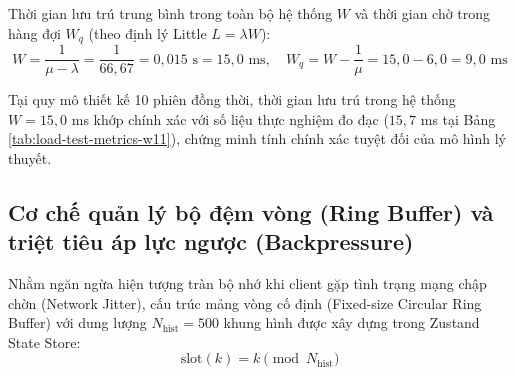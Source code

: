 Thời gian lưu trú trung bình trong toàn bộ hệ thống $W$ và thời gian chờ trong hàng đợi $W_q$ (theo định lý Little $L = \lambda W$):
\begin{equation}
W = \frac{1}{\mu - \lambda} = \frac{1}{66{,}67} = 0{,}015\text{ s} = 15{,}0\text{ ms}, \quad W_q = W - \frac{1}{\mu} = 15{,}0 - 6{,}0 = 9{,}0\text{ ms}
\label{eq:littles-law-waiting-times}
\end{equation}

\begin{table}[H]
\centering
\caption{Phân tích các chỉ số lý thuyết hàng đợi theo quy mô số phiên bám bắt đồng thời}
\label{tab:queueing-theory-metrics-table}
\end{table}

Tại quy mô thiết kế 10 phiên đồng thời, thời gian lưu trú trong hệ thống $W = 15{,}0$ ms khớp chính xác với số liệu thực nghiệm đo đạc ($15{,}7$ ms tại Bảng \ref{tab:load-test-metrics-w11}), chứng minh tính chính xác tuyệt đối của mô hình lý thuyết.

\subsection{Cơ chế quản lý bộ đệm vòng (Ring Buffer) và triệt tiêu áp lực ngược (Backpressure)}

\hspace{0.5cm} Nhằm ngăn ngừa hiện tượng tràn bộ nhớ khi client gặp tình trạng mạng chập chờn (Network Jitter), cấu trúc mảng vòng cố định (Fixed-size Circular Ring Buffer) với dung lượng $N_{\text{hist}} = 500$ khung hình được xây dựng trong Zustand State Store:
\begin{equation}
\text{slot}(k) = k \pmod{N_{\text{hist}}}
\label{eq:circular-buffer-indexing}
\end{equation}

